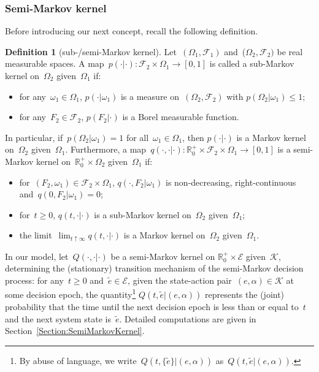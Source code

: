 \documentclass{amsart}[11pt]
\numberwithin{equation}{section}
\theoremstyle{definition}
\newtheorem{definition}[theorem]{Definition}
\newcommand{\RR}{\mathbb{R}}
\newcommand{\Kk}{\mathcal{K}}
\newcommand{\Ee}{\mathcal{E}}
\begin{document}
\subsubsection{Semi-Markov kernel}\label{subsubsec:semi-Markov kernel}
Before introducing our next concept, recall the following definition.
\begin{definition}[sub-/semi-Markov kernel]\label{def:kernel}
Let~$(\Omega_1, \mathcal{F}_1)$ and~($\Omega_2, \mathcal{F}_2)$ be real measurable spaces.
A map~$p(\cdot | \cdot): \mathcal{F}_2\times\Omega_1\to[0 ,1]$
is called a sub-Markov kernel on~$\Omega_2$ given~$\Omega_1$ if:
\begin{itemize}
\item for any~$\omega_1\in\Omega_1$, 
$p(\cdot | \omega_1)$ is a measure on~$(\Omega_2, \mathcal{F}_2)$ with $p(\Omega_2 | \omega_1) \leq 1$;
\item for any~$F_2\in\mathcal{F}_2$, $p(F_2\lvert\cdot)$ is a Borel measurable function.
\end{itemize}
In particular, if~$p(\Omega_2\lvert\omega_1) = 1$ for all~$\omega_1\in\Omega_1$,
then $p(\cdot\lvert\cdot)$ is a Markov kernel on~$\Omega_2$ given~$\Omega_1$.
Furthermore, a map~$q(\cdot, \cdot | \cdot): \RR^+_0\times\mathcal{F}_2\times\Omega_1\to[0, 1]$ 
is a semi-Markov kernel on~$\RR^+_0\times\Omega_2$ given~$\Omega_1$ if:
\begin{itemize}
\item for~$(F_2, \omega_1)\in\mathcal{F}_2\times\Omega_1$,
$q(\cdot, F_2\lvert \omega_1)$ is non-decreasing, right-continuous and~$q(0, F_2\lvert \omega_1) = 0$;
\item for~$t\geq0$, $q(t, \cdot | \cdot)$
is a sub-Markov kernel on~$\Omega_2$ given~$\Omega_1$;
\item the limit~$\displaystyle\lim_{t\uparrow \infty}q(t, \cdot | \cdot)$
is a Markov kernel on~$\Omega_2$ given~$\Omega_1$.
\end{itemize}
\end{definition}
In our model, let~$Q(\cdot, \cdot\lvert \cdot)$  be a semi-Markov kernel on $\RR^+_0\times \Ee$ given~$\Kk$,
determining the (stationary) transition mechanism of the semi-Markov decision process:
for any~$t\geq 0$ and~$\tilde{e}\in \Ee$, 
given the state-action pair~$(e, \alpha)\in \Kk$ at some decision epoch,
the quantity\footnote{By abuse of language,
we write~$Q(t, \{\tilde{e}\}\lvert({e}, {\alpha}))$ as~$Q(t, \tilde{e}\lvert({e}, {\alpha}))$.}
$Q(t, \tilde{e}\lvert ({e}, {\alpha}))$ represents 
the (joint) probability that the time until the next decision epoch is less than or equal to~$t$ 
and the next system state is~$\tilde{e}$. 
Detailed computations are given in Section~\ref{Section:SemiMarkovKernel}.
\end{document}
